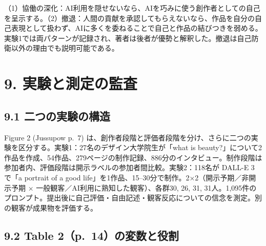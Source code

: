 \documentclass[
  11pt,
  a4paper,
]{article}
\begin{document}
（1）協働の深化：AI利用を隠せないなら、AIを巧みに使う創作者としての自己を呈示する。（2）撤退：人間の貢献を承認してもらえないなら、作品を自分の自己表現として扱わず、AIに多くを委ねることで自己と作品の結びつきを弱める。実験1では両パターンが記録され、著者は後者が優勢と解釈した。撤退は自己防衛以外の理由でも説明可能である。

\section{9.
実験と測定の監査}\label{ux5b9fux9a13ux3068ux6e2cux5b9aux306eux76e3ux67fb}

\subsection{9.1
二つの実験の構造}\label{ux4e8cux3064ux306eux5b9fux9a13ux306eux69cbux9020}

Figure 2 (Jussupow p.~7)
は、創作者段階と評価者段階を分け、さらに二つの実験を区分する。実験1：27名のデザイン大学院生が「what
is
beauty?」について2作品を作成、54作品、279ページの制作記録、886分のインタビュー。制作段階は参加者内、評価段階は開示ラベルの参加者間比較。実験2：118名が
DALL-E 3 で「a portrait of a good
life」を1作品、15--30分で制作。2×2（開示予期／非開示予期 ×
一般観客／AI利用に熟知した観客）、各群30, 26, 31,
31人。1,095件のプロンプト。提出後に自己評価・自由記述・観客反応についての信念を測定。別の観客が成果物を評価する。

\subsection{9.2 Table
2（p.~14）の変数と役割}\label{table-2p.-14ux306eux5909ux6570ux3068ux5f79ux5272}
\end{document}
